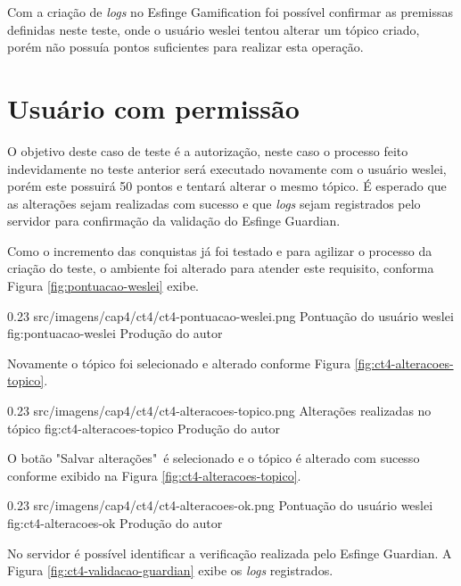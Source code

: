 \par Com a criação de \textit{logs} no Esfinge Gamification foi possível confirmar as premissas definidas neste teste, onde o usuário weslei tentou alterar um tópico criado, porém não possuía pontos suficientes para realizar esta operação.

\section{Usuário com permissão}

\par O objetivo deste caso de teste é a autorização, neste caso o processo feito indevidamente no teste anterior será executado novamente com o usuário weslei, porém este possuirá 50 pontos e tentará alterar o mesmo tópico. É esperado que as alterações sejam realizadas com sucesso e que \textit{logs} sejam registrados pelo servidor para confirmação da validação do Esfinge Guardian.

\par Como o incremento das conquistas já foi testado e para agilizar o processo da criação do teste, o ambiente foi alterado para atender este requisito, conforma Figura \ref{fig:pontuacao-weslei} exibe.

\begin{image}
{0.23}
{src/imagens/cap4/ct4/ct4-pontuacao-weslei.png}
{Pontuação do usuário weslei}
{fig:pontuacao-weslei}
{Produção do autor}
\end{image}

\par Novamente o tópico foi selecionado e alterado conforme Figura \ref{fig:ct4-alteracoes-topico}.

\begin{image}
{0.23}
{src/imagens/cap4/ct4/ct4-alteracoes-topico.png}
{Alterações realizadas no tópico}
{fig:ct4-alteracoes-topico}
{Produção do autor}
\end{image}

\par O botão "Salvar alterações"\ é selecionado e o tópico é alterado com sucesso conforme exibido na Figura \ref{fig:ct4-alteracoes-topico}.

\begin{image}
{0.23}
{src/imagens/cap4/ct4/ct4-alteracoes-ok.png}
{Pontuação do usuário weslei}
{fig:ct4-alteracoes-ok}
{Produção do autor}
\end{image}

\par No servidor é possível identificar a verificação realizada pelo Esfinge Guardian. A Figura \ref{fig:ct4-validacao-guardian} exibe os \textit{logs} registrados.

